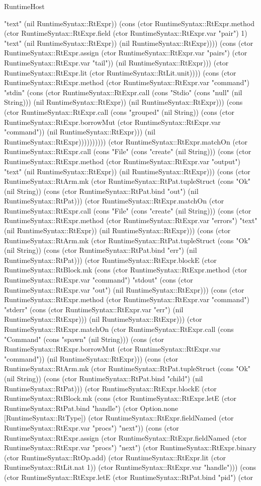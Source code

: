 \begin{lexlean}{RuntimeHost}
\begin{semanticmodule}
{"text" (nil RuntimeSyntax::RtExpr)) (cons (ctor RuntimeSyntax::RtExpr.method (ctor RuntimeSyntax::RtExpr.field (ctor RuntimeSyntax::RtExpr.var "pair") 1) "text" (nil RuntimeSyntax::RtExpr)) (nil RuntimeSyntax::RtExpr)))) (cons (ctor RuntimeSyntax::RtExpr.assign (ctor RuntimeSyntax::RtExpr.var "pairs") (ctor RuntimeSyntax::RtExpr.var "tail")) (nil RuntimeSyntax::RtExpr))) (ctor RuntimeSyntax::RtExpr.lit (ctor RuntimeSyntax::RtLit.unit)))) (cons (ctor RuntimeSyntax::RtExpr.method (ctor RuntimeSyntax::RtExpr.var "command") "stdin" (cons (ctor RuntimeSyntax::RtExpr.call (cons "Stdio" (cons "null" (nil String))) (nil RuntimeSyntax::RtExpr)) (nil RuntimeSyntax::RtExpr))) (cons (ctor RuntimeSyntax::RtExpr.call (cons "grouped" (nil String)) (cons (ctor RuntimeSyntax::RtExpr.borrowMut (ctor RuntimeSyntax::RtExpr.var "command")) (nil RuntimeSyntax::RtExpr))) (nil RuntimeSyntax::RtExpr)))))))))) (ctor RuntimeSyntax::RtExpr.matchOn (ctor RuntimeSyntax::RtExpr.call (cons "File" (cons "create" (nil String))) (cons (ctor RuntimeSyntax::RtExpr.method (ctor RuntimeSyntax::RtExpr.var "output") "text" (nil RuntimeSyntax::RtExpr)) (nil RuntimeSyntax::RtExpr))) (cons (ctor RuntimeSyntax::RtArm.mk (ctor RuntimeSyntax::RtPat.tupleStruct (cons "Ok" (nil String)) (cons (ctor RuntimeSyntax::RtPat.bind "out") (nil RuntimeSyntax::RtPat))) (ctor RuntimeSyntax::RtExpr.matchOn (ctor RuntimeSyntax::RtExpr.call (cons "File" (cons "create" (nil String))) (cons (ctor RuntimeSyntax::RtExpr.method (ctor RuntimeSyntax::RtExpr.var "errors") "text" (nil RuntimeSyntax::RtExpr)) (nil RuntimeSyntax::RtExpr))) (cons (ctor RuntimeSyntax::RtArm.mk (ctor RuntimeSyntax::RtPat.tupleStruct (cons "Ok" (nil String)) (cons (ctor RuntimeSyntax::RtPat.bind "err") (nil RuntimeSyntax::RtPat))) (ctor RuntimeSyntax::RtExpr.blockE (ctor RuntimeSyntax::RtBlock.mk (cons (ctor RuntimeSyntax::RtExpr.method (ctor RuntimeSyntax::RtExpr.var "command") "stdout" (cons (ctor RuntimeSyntax::RtExpr.var "out") (nil RuntimeSyntax::RtExpr))) (cons (ctor RuntimeSyntax::RtExpr.method (ctor RuntimeSyntax::RtExpr.var "command") "stderr" (cons (ctor RuntimeSyntax::RtExpr.var "err") (nil RuntimeSyntax::RtExpr))) (nil RuntimeSyntax::RtExpr))) (ctor RuntimeSyntax::RtExpr.matchOn (ctor RuntimeSyntax::RtExpr.call (cons "Command" (cons "spawn" (nil String))) (cons (ctor RuntimeSyntax::RtExpr.borrowMut (ctor RuntimeSyntax::RtExpr.var "command")) (nil RuntimeSyntax::RtExpr))) (cons (ctor RuntimeSyntax::RtArm.mk (ctor RuntimeSyntax::RtPat.tupleStruct (cons "Ok" (nil String)) (cons (ctor RuntimeSyntax::RtPat.bind "child") (nil RuntimeSyntax::RtPat))) (ctor RuntimeSyntax::RtExpr.blockE (ctor RuntimeSyntax::RtBlock.mk (cons (ctor RuntimeSyntax::RtExpr.letE (ctor RuntimeSyntax::RtPat.bind "handle") (ctor Option.none [RuntimeSyntax::RtType]) (ctor RuntimeSyntax::RtExpr.fieldNamed (ctor RuntimeSyntax::RtExpr.var "procs") "next")) (cons (ctor RuntimeSyntax::RtExpr.assign (ctor RuntimeSyntax::RtExpr.fieldNamed (ctor RuntimeSyntax::RtExpr.var "procs") "next") (ctor RuntimeSyntax::RtExpr.binary (ctor RuntimeSyntax::RtOp.add) (ctor RuntimeSyntax::RtExpr.lit (ctor RuntimeSyntax::RtLit.nat 1)) (ctor RuntimeSyntax::RtExpr.var "handle"))) (cons (ctor RuntimeSyntax::RtExpr.letE (ctor RuntimeSyntax::RtPat.bind "pid") (ctor }
\end{semanticmodule}
\end{lexlean}
